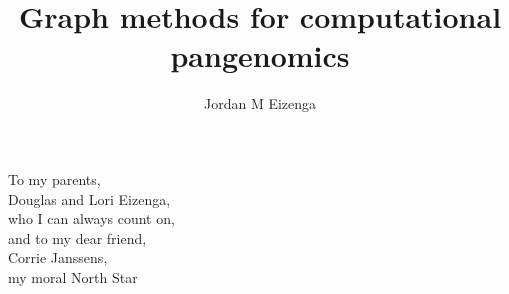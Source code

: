 \documentclass[11pt]{ucthesis}
\begin{document}

\title{Graph methods for computational pangenomics}
\author{Jordan M Eizenga}
\deanlinethree{}

\begin{frontmatter}

\maketitle
\copyrightpage

\tableofcontents
\listoffigures
\listoftables

\begin{abstract}


\end{abstract}

\begin{dedication}
\null\vfil
{\large
\begin{center}
To my parents,\\%
Douglas and Lori Eizenga,\\%
who I can always count on, \\\vspace{48pt}
and to my dear friend, \\%
Corrie Janssens,\\%
my moral North Star
\end{center}}
\vfil\null
\end{dedication}


\begin{acknowledgements}


\end{acknowledgements}

\end{frontmatter}
\end{document}

